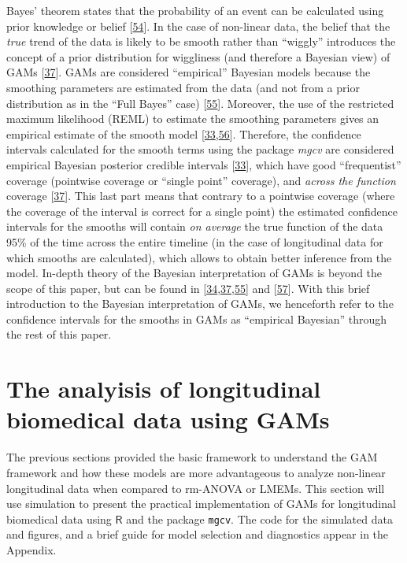 \documentclass[
]{article}
\newcommand{\passthrough}[1]{#1}
\begin{document}
Bayes' theorem states that the probability of an event can be calculated using prior knowledge or belief {[}\protect\hyperlink{ref-mcelreath2018}{54}{]}. In the case of non-linear data, the belief that the \emph{true} trend of the data is likely to be smooth rather than ``wiggly'' introduces the concept of a prior distribution for wiggliness (and therefore a Bayesian view) of GAMs {[}\protect\hyperlink{ref-wood2017}{37}{]}. GAMs are considered ``empirical'' Bayesian models because the smoothing parameters are estimated from the data (and not from a prior distribution as in the ``Full Bayes'' case) {[}\protect\hyperlink{ref-miller2019}{55}{]}. Moreover, the use of the restricted maximum likelihood (REML) to estimate the smoothing parameters gives an empirical estimate of the smooth model {[}\protect\hyperlink{ref-pedersen2019}{33},\protect\hyperlink{ref-laird1982}{56}{]}. Therefore, the confidence intervals calculated for the smooth terms using the package \emph{mgcv} are considered empirical Bayesian posterior credible intervals {[}\protect\hyperlink{ref-pedersen2019}{33}{]}, which have good ``frequentist'' coverage (pointwise coverage or ``single point'' coverage), and \emph{across the function} coverage {[}\protect\hyperlink{ref-wood2017}{37}{]}. This last part means that contrary to a pointwise coverage (where the coverage of the interval is correct for a single point) the estimated confidence intervals for the smooths will contain \emph{on average} the true function of the data 95\% of the time across the entire timeline (in the case of longitudinal data for which smooths are calculated), which allows to obtain better inference from the model. In-depth theory of the Bayesian interpretation of GAMs is beyond the scope of this paper, but can be found in {[}\protect\hyperlink{ref-simpson2018}{34},\protect\hyperlink{ref-wood2017}{37},\protect\hyperlink{ref-miller2019}{55}{]} and {[}\protect\hyperlink{ref-marra2012}{57}{]}. With this brief introduction to the Bayesian interpretation of GAMs, we henceforth refer to the confidence intervals for the smooths in GAMs as ``empirical Bayesian'' through the rest of this paper.

\FloatBarrier

\hypertarget{longitudinal-GAMs}{%
\section{The analyisis of longitudinal biomedical data using GAMs}\label{longitudinal-GAMs}}

The previous sections provided the basic framework to understand the GAM framework and how these models are more advantageous to analyze non-linear longitudinal data when compared to rm-ANOVA or LMEMs. This section will use simulation to present the practical implementation of GAMs for longitudinal biomedical data using \(\textsf{R}\) and the package \passthrough{\lstinline!mgcv!}. The code for the simulated data and figures, and a brief guide for model selection and diagnostics appear in the Appendix.
\end{document}

